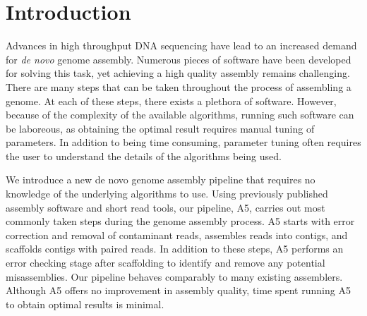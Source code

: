 \documentclass{bioinfo}
\begin{document}
\section{Introduction}
Advances in high throughput DNA sequencing have lead to an increased demand for \emph{de novo} 
genome assembly. Numerous pieces of software have been developed for solving this task, yet
achieving a high quality assembly remains challenging. There are many 
steps that can be taken throughout the process of assembling a genome. At each of these steps,
there exists a plethora of software. However, because of the complexity of the available algorithms,
running such software can be laboreous, as obtaining the optimal result requires manual tuning of parameters.
In addition to being time consuming, parameter tuning often requires the user to understand the details
of the algorithms being used. 

We introduce a new de novo genome assembly pipeline that requires no knowledge of the underlying algorithms to use. 
Using previously published assembly software and short read tools, our pipeline, A5, carries out
most commonly taken steps during the genome assembly process. A5 starts with error correction
and removal of contaminant reads, assembles reads into contigs, and scaffolds
contigs with paired reads. In addition to these steps, A5 performs an 
error checking stage after scaffolding to identify and remove any potential misassemblies. 
Our pipeline behaves comparably to many existing assemblers. Although A5 offers no improvement
in assembly quality, time spent running A5 to obtain optimal results is minimal. 
\end{document}
